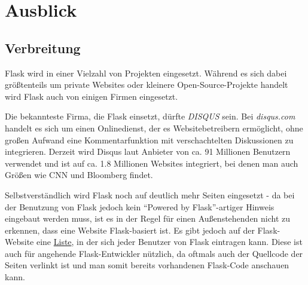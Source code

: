 \chapter{Ausblick}

\section{Verbreitung}
Flask wird in einer Vielzahl von Projekten eingesetzt. Während es sich dabei größtenteils um private
Websites oder kleinere Open-Source-Projekte handelt wird Flask auch von einigen Firmen eingesetzt.

Die bekannteste Firma, die Flask einsetzt, dürfte \emph{DISQUS} sein. Bei \emph{disqus.com} handelt
es sich um einen Onlinedienst, der es Websitebetreibern ermöglicht, ohne großen Aufwand eine
Kommentarfunktion mit verschachtelten Diskussionen zu integrieren. Derzeit wird Disqus laut Anbieter
von ca. 91 Millionen Benutzern verwendet und ist auf ca. 1.8 Millionen Websites integriert, bei
denen man auch Größen wie CNN und Bloomberg findet.


Selbstverständlich wird Flask noch auf deutlich mehr Seiten eingesetzt - da bei der Benutzung von
Flask jedoch kein \enquote{Powered by Flask}-artiger Hinweis eingebaut werden muss, ist es in der
Regel für einen Außenstehenden nicht zu erkennen, dass eine Website Flask-basiert ist. Es gibt
jedoch auf der Flask-Website eine \href{http://flask.pocoo.org/community/poweredby/}{Liste}, in der
sich jeder Benutzer von Flask eintragen kann. Diese ist auch für angehende Flask-Entwickler
nützlich, da oftmals auch der Quellcode der Seiten verlinkt ist und man somit bereits vorhandenen
Flask-Code anschauen kann.

